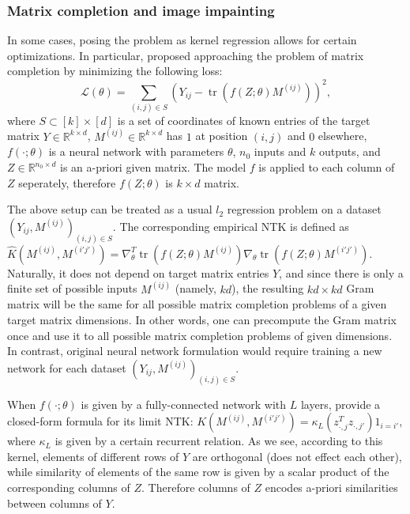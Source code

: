 \documentclass{article}
\newcommand{\LL}{\mathcal{L}}
\newcommand{\RR}{\mathbb{R}}
\DeclareMathOperator*{\tr}{tr}
\begin{document}
    \subsubsection{Matrix completion and image impainting}

    In some cases, posing the problem as kernel regression allows for certain optimizations.
    In particular, \cite{radhakrishnan2021simple} proposed approaching the problem of matrix completion by minimizing the following loss:
    \begin{equation}
        \LL(\theta)
        = \sum_{(i,j) \in S} (Y_{ij} - \tr(f(Z;\theta) M^{(ij)}))^2,
    \end{equation}
    where $S \subset [k] \times [d]$ is a set of coordinates of known entries of the target matrix $Y \in \RR^{k \times d}$, $M^{(ij)} \in \RR^{k \times d}$ has $1$ at position $(i,j)$ and $0$ elsewhere, $f(\cdot;\theta)$ is a neural network with parameters $\theta$, $n_0$ inputs and $k$ outputs, and $Z \in \RR^{n_0 \times d}$ is an a-priori given matrix.
    The model $f$ is applied to each column of $Z$ seperately, therefore $f(Z;\theta)$ is $k \times d$ matrix.

    The above setup can be treated as a usual $l_2$ regression problem on a dataset $(Y_{ij}, M^{(ij)})_{(i,j) \in S}$.
    The corresponding empirical NTK is defined as $\hat K(M^{(ij)}, M^{(i'j')}) = \nabla^T_\theta \tr(f(Z;\theta) M^{(ij)}) \nabla_\theta \tr(f(Z;\theta) M^{(i'j')})$.
    Naturally, it does not depend on target matrix entries $Y$, and since there is only a finite set of possible inputs $M^{(ij)}$ (namely, $k d$), the resulting $kd \times kd$ Gram matrix will be the same for all possible matrix completion problems of a given target matrix dimensions.
    In other words, one can precompute the Gram matrix once and use it to all possible matrix completion problems of given dimensions.
    In contrast, original neural network formulation would require training a new network for each dataset $(Y_{ij}, M^{(ij)})_{(i,j) \in S}$.

    When $f(\cdot;\theta)$ is given by a fully-connected network with $L$ layers, \cite{radhakrishnan2021simple} provide a closed-form formula for its limit NTK: $K(M^{(ij)}, M^{(i'j')}) = \kappa_L\left(z_{\cdot,j}^T z_{\cdot,j'}\right) 1_{i=i'}$, where $\kappa_L$ is given by a certain recurrent relation.
    As we see, according to this kernel, elements of different rows of $Y$ are orthogonal (does not effect each other), while similarity of elements of the same row is given by a scalar product of the corresponding columns of $Z$.
    Therefore columns of $Z$ encodes a-priori similarities between columns of $Y$.
\end{document}

